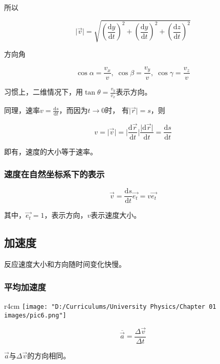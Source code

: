 \documentclass[12pt, a4paper]{article}
\newcommand{\rmd}{\mathrm{d}}
\begin{document}
    所以

    \[
    \lvert\overrightarrow{v} \rvert = \sqrt{\left(\frac{\rmd y}{\rmd t}\right)^2 +
    \left(\frac{\rmd y}{\rmd t}\right)^2 + \left(\frac{\rmd z}{\rmd t}\right)^2}
    \]

    方向角

    \[
        \cos \alpha = \frac{v_x}{v},\; \cos \beta = \frac{v_y}{v}, \;\cos \gamma = \frac{v_z}{v}
    \]

    习惯上，二维情况下，用\(\tan \theta = \frac{v_y}{v_x}\)表示方向。

    同理，速率\(v = \frac{\rmd s}{\rmd t}\)，而因为\(t \rightarrow 0\)时，
    有\(\lvert\overrightarrow{r}\rvert = s\)，则

    \[
    v = \lvert\overrightarrow{v}\rvert =
    \lvert\frac{\rmd \overrightarrow{r}}{\rmd t}\rvert
    \frac{\lvert\rmd \overrightarrow{r}\rvert}{\rmd t}
    = \frac{\rmd s}{\rmd t}
    \]

    即有，速度的大小等于速率。

\subsubsection{速度在自然坐标系下的表示}

    \[
    \overrightarrow{v} = \frac{\rmd s}{\rmd t}\overrightarrow{e_{t}}
    = v \overrightarrow{e_{t}}
    \]

    其中，\(\overrightarrow{e_{t}} = 1\)，表示方向，\(v\)表示速度大小。

\subsection{加速度}

    反应速度大小和方向随时间变化快慢。

\subsubsection{平均加速度}

    \begin{wrapfigure}{r}{4cm}
        \centering
        \texttt{[image: "D:/Curriculums/University Physics/Chapter 01 images/pic6.png"]}
        \label{pic6}
    \end{wrapfigure}


    \[
    \overline{\overrightarrow{a}} = \frac{\Delta \overrightarrow{v}}{\Delta t}
    \]

    \(\overrightarrow{a}\)与\(\Delta \overrightarrow{v}\)的方向相同。
\end{document}
